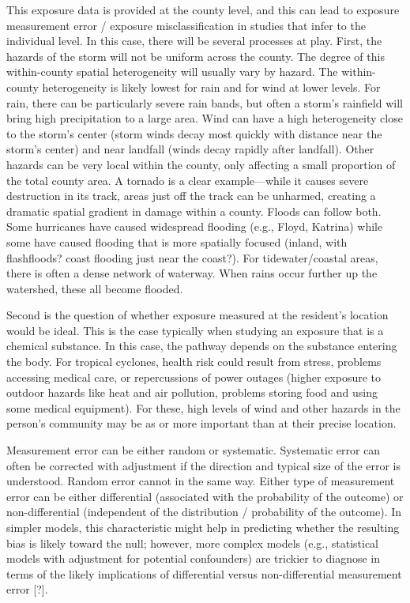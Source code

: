 This exposure data is provided at the county level, and this can lead to
exposure measurement error / exposure misclassification in studies that infer to
the individual level. In this case, there will be several processes at play.
First, the hazards of the storm will not be uniform across the county. The
degree of this within-county spatial heterogeneity will usually vary by hazard.
The within-county heterogeneity is likely lowest for rain and for wind at lower
levels. For rain, there can be particularly severe rain bands, but often a
storm's rainfield will bring high precipitation to a large area. Wind can have a
high heterogeneity close to the storm's center (storm winds decay most quickly
with distance near the storm's center) and near landfall (winds decay rapidly
after landfall). Other hazards can be very local within the county, only
affecting a small proportion of the total county area. A tornado is a clear
example---while it causes severe destruction in its track, areas just off the
track can be unharmed, creating a dramatic spatial gradient in damage within a
county. Floods can follow both. Some hurricanes have caused widespread flooding
(e.g., Floyd, Katrina) while some have caused flooding that is more spatially
focused (inland, with flashfloods? coast flooding just near the coast?). For
tidewater/coastal areas, there is often a dense network of waterway. When rains
occur further up the watershed, these all become flooded.

Second is the question of whether exposure measured at the resident's location
would be ideal. This is the case typically when studying an exposure that is a
chemical substance. In this case, the pathway depends on the substance entering
the body. For tropical cyclones, health risk could result from stress, problems
accessing medical care, or repercussions of power outages (higher exposure to
outdoor hazards like heat and air pollution, problems storing food and using
some medical equipment). For these, high levels of wind and other hazards in the
person's community may be as or more important than at their precise location.

Measurement error can be either random or systematic. Systematic error can often
be corrected with adjustment if the direction and typical size of the error is
understood. Random error cannot in the same way. Either type of measurement
error can be either differential (associated with the probability of the
outcome) or non-differential (independent of the distribution / probability of
the outcome). In simpler models, this characteristic might help in predicting
whether the resulting bias is likely toward the null; however, more complex
models (e.g., statistical models with adjustment for potential confounders) are
trickier to diagnose in terms of the likely implications of differential versus
non-differential measurement error [?].

